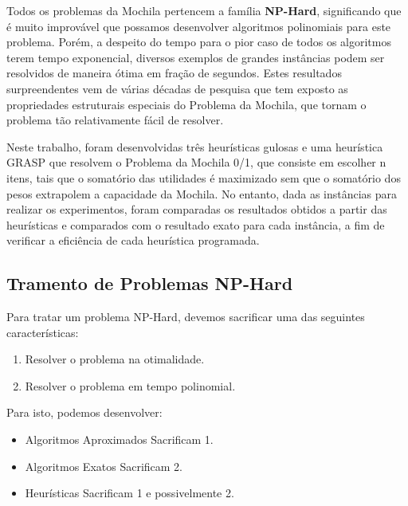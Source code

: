 \documentclass[a4paper, 12pt]{article}
\begin{document}
Todos os problemas da Mochila pertencem a família \textbf{NP-Hard}\cite{pisinger1995algorithms}, significando que
é muito improvável que possamos desenvolver algoritmos polinomiais para este problema. Porém, a 
despeito do tempo para o pior caso de todos os algoritmos terem tempo exponencial, diversos exemplos 
de grandes instâncias podem ser resolvidos de maneira ótima em fração de segundos. 
Estes resultados surpreendentes vem de várias décadas de pesquisa que tem exposto as propriedades 
estruturais especiais do Problema da Mochila, que tornam o problema tão relativamente fácil de resolver.

Neste trabalho, foram desenvolvidas três heurísticas gulosas e uma heurística GRASP que resolvem 
o Problema da Mochila 0/1, que consiste em escolher n itens, tais que o somatório das utilidades é maximizado sem 
que o somatório dos pesos extrapolem a capacidade da Mochila. No entanto, dada as instâncias para realizar
os experimentos, foram comparadas os resultados obtidos a partir das heurísticas e comparados com o resultado
exato para cada instância, a fim de verificar a eficiência de cada heurística programada.




\subsection{Tramento de Problemas NP-Hard}

Para tratar um problema NP-Hard, devemos sacrificar uma das seguintes características:
\begin{enumerate}
    \item Resolver o problema na otimalidade.
    \item Resolver o problema em tempo polinomial.
\end{enumerate}
Para isto, podemos desenvolver:
\begin{itemize}
    \item Algoritmos Aproximados Sacrificam 1.
    \item Algoritmos Exatos Sacrificam 2.
    \item Heurísticas Sacrificam 1 e possivelmente 2.
\end{itemize}
\end{document}
